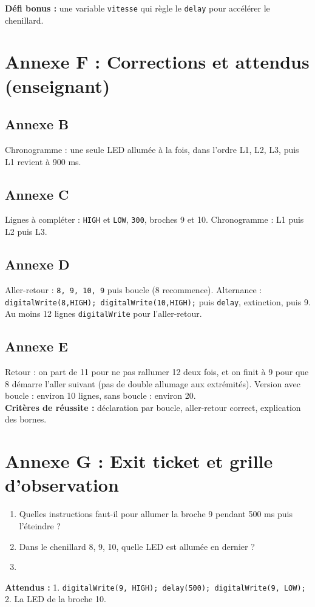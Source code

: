 \documentclass[11pt,a4paper]{article}
\begin{document}
\textbf{Défi bonus :} une variable \texttt{vitesse} qui règle le \texttt{delay} pour accélérer le chenillard.

\newpage
\section*{Annexe F : Corrections et attendus (enseignant)}

\subsection*{Annexe B}
Chronogramme : une seule LED allumée à la fois, dans l'ordre L1, L2, L3, puis L1 revient à 900 ms.

\subsection*{Annexe C}
Lignes à compléter : \texttt{HIGH} et \texttt{LOW}, \texttt{300}, broches 9 et 10. Chronogramme : L1 puis L2 puis L3.

\subsection*{Annexe D}
Aller-retour : \texttt{8, 9, 10, 9} puis boucle (8 recommence). Alternance : \texttt{digitalWrite(8,HIGH); digitalWrite(10,HIGH);} puis \texttt{delay}, extinction, puis 9. Au moins 12 lignes \texttt{digitalWrite} pour l'aller-retour.

\subsection*{Annexe E}
Retour : on part de 11 pour ne pas rallumer 12 deux fois, et on finit à 9 pour que 8 démarre l'aller suivant (pas de double allumage aux extrémités). Version avec boucle : environ 10 lignes, sans boucle : environ 20.\\
\textbf{Critères de réussite :} déclaration par boucle, aller-retour correct, explication des bornes.

\newpage
\section*{Annexe G : Exit ticket et grille d'observation}

\begin{enumerate}
 \item Quelles instructions faut-il pour allumer la broche 9 pendant 500 ms puis l'éteindre ?\\ \lig
 \item Dans le chenillard 8, 9, 10, quelle LED est allumée en dernier ?\\ \lig
 \item \autoeval
\end{enumerate}
\textbf{Attendus :} 1. \texttt{digitalWrite(9, HIGH); delay(500); digitalWrite(9, LOW);} 2. La LED de la broche 10.

\bigskip
{}
\end{document}

